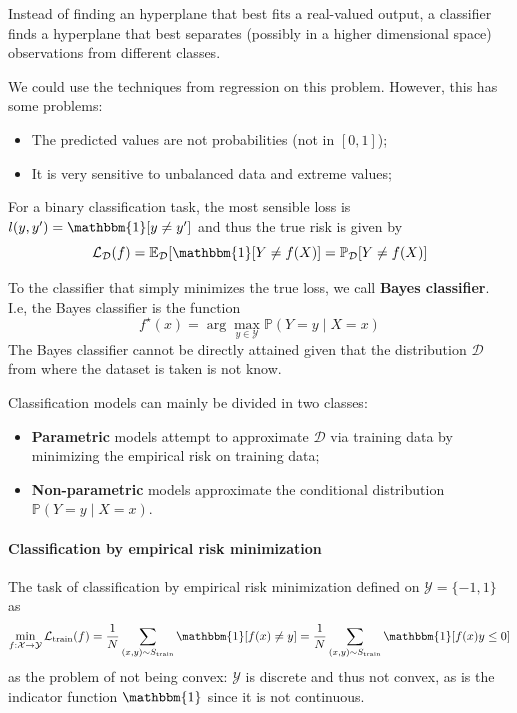 \documentclass{article}
\newcommand{\prob}{\mathbb{P}}
\newcommand{\E}{\mathbb{E}}
\newcommand{\ind}{\mathbbm{1}}
\newcommand{\loss}{\mathcal{L}}
\newcommand{\dist}{\mathcal{D}}
\begin{document}
Instead of finding an hyperplane that best fits a real-valued output, a classifier finds a hyperplane that best separates (possibly in a higher dimensional space) observations from different classes.

We could use the techniques from regression on this problem.
However, this has some problems:
\begin{itemize}
    \item The predicted values are not probabilities (not in $[0,1]$);
    \item It is very sensitive to unbalanced data and extreme values;
\end{itemize}

For a binary classification task, the most sensible loss is $l(y, y') = \ind[y \neq y']$ and thus the true risk is given by
$$
\loss_\dist(f) = 
\E_\dist[\ind[Y \neq f(X)] = 
\prob_\dist[Y \neq f(X)]
$$

To the classifier that simply minimizes the true loss, we call \textbf{Bayes classifier}.
I.e, the Bayes classifier is the function
$$
f^\star(x) = \arg \max_{y \in \mathcal{Y}} \prob(Y = y \mid X = x)
$$
The Bayes classifier cannot be directly attained given that the distribution $\dist$ from where the dataset is taken is not know.

Classification models can mainly be divided in two classes:
\begin{itemize}
    \item \textbf{Parametric} models attempt to approximate $\dist$ via training data by minimizing the empirical risk on training data;
    \item \textbf{Non-parametric} models approximate the conditional distribution $\prob(Y = y \mid X = x)$.
\end{itemize}

\paragraph{Classification by empirical risk minimization}

The task of classification by empirical risk minimization defined on $\mathcal{Y} = \{-1, 1\}$ as
$$
\min_{f : \mathcal{X} \to \mathcal{Y}} \loss_{\text{train}}(f) =
\frac{1}{N} \sum_{(x, y) \sim S_{\text{train}}} \ind[f(x) \neq y] = 
\frac{1}{N} \sum_{(x, y) \sim S_{\text{train}}} \ind[f(x)y \leq 0] 
$$
as the problem of not being convex: $\mathcal{Y}$ is discrete and thus not convex, as is the indicator function $\ind$ since it is not continuous.
\end{document}
